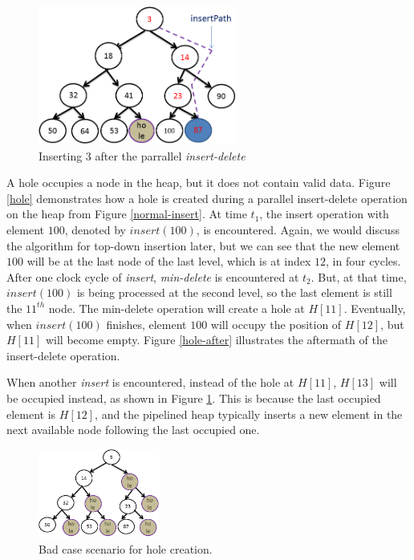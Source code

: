 \begin{figure}[!ht]
  \centering
  \includegraphics[width=6.5cm]{fig/skiphole.png}
      \caption{Inserting $3$ after the parrallel {\it insert-delete}}
    \label{skiphole}
\end{figure}

A hole occupies a node in the heap, but it does not contain valid data.
Figure \ref{hole} demonstrates how a hole is created during a parallel insert-delete operation on the heap from Figure \ref{normal-insert}.
At time $t_1$, the insert operation with element $100$, denoted by $insert(100)$, is encountered.
Again, we would discuss the algorithm for top-down insertion later, but we can see that the new element $100$ will be at the last node of the last level, which is at index $12$, in four cycles.
After one clock cycle of {\it insert}, {\it min-delete} is encountered at $t_2$.
But, at that time, $insert(100)$ is being processed at the second level, so the last element is still the $11^{th}$ node.
The min-delete operation will create a hole at $H[11]$.
Eventually, when $insert(100)$ finishes, element $100$ will occupy the position of $H[12]$, but $H[11]$ will become empty.
Figure \ref{hole-after} illustrates the aftermath of the insert-delete operation.

When another {\it insert} is encountered, instead of the hole at $H[11]$, $H[13]$ will be occupied instead, as shown in Figure \ref{skiphole}. 
This is because the last occupied element is $H[12]$, and the pipelined heap typically inserts a new element in the next available node following the last occupied one.

\begin{figure}[!ht]
  \centering
  \includegraphics[width=4cm]{fig/hole.png}
      \caption{Bad case scenario for hole creation.}
    \label{badcase}
\end{figure}

